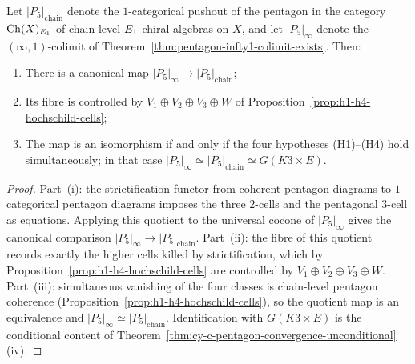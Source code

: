 \begin{proposition}
\label{prop:chain-infty-reduction}
Let $|P_5|_{\mathrm{chain}}$ denote the $1$-categorical pushout of the pentagon in the category
$\mathrm{Ch}(X)_{E_{1}}$ of chain-level $E_{1}$-chiral algebras on $X$, and let $|P_5|_\infty$
denote the $(\infty,1)$-colimit of Theorem~\ref{thm:pentagon-infty1-colimit-exists}. Then:
\begin{enumerate}[label=\textup{(\roman*)}]
 \item There is a canonical map $|P_5|_\infty \to |P_5|_{\mathrm{chain}}$;
 \item Its fibre is controlled by $V_1 \oplus V_2 \oplus V_3 \oplus W$ of
 Proposition~\ref{prop:h1-h4-hochschild-cells};
 \item The map is an isomorphism if and only if the four hypotheses
 (H1)--(H4) hold simultaneously; in that case $|P_5|_\infty \simeq |P_5|_{\mathrm{chain}} \simeq
 G(K3 \times E)$.
\end{enumerate}
\end{proposition}

\begin{proof}
Part~(i): the strictification functor from coherent pentagon diagrams to
$1$-categorical pentagon diagrams imposes the three $2$-cells and the
pentagonal $3$-cell as equations. Applying this quotient to the
universal cocone of $|P_5|_\infty$ gives the canonical comparison
$|P_5|_\infty \to |P_5|_{\mathrm{chain}}$. Part~(ii): the fibre of
this quotient records exactly the higher cells killed by strictification,
which by Proposition~\ref{prop:h1-h4-hochschild-cells} are controlled by
$V_1 \oplus V_2 \oplus V_3 \oplus W$. Part~(iii): simultaneous
vanishing of the four classes is chain-level pentagon coherence
(Proposition~\ref{prop:h1-h4-hochschild-cells}), so the quotient map is
an equivalence and $|P_5|_\infty \simeq |P_5|_{\mathrm{chain}}$.
Identification with $G(K3 \times E)$ is the conditional content of
Theorem~\ref{thm:cy-c-pentagon-convergence-unconditional}(iv).
\end{proof}

